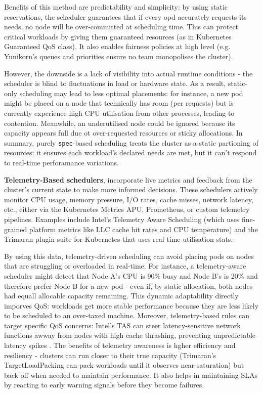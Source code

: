 Benefits of this method are predictability and
simplicity: by using static reservations, the scheduler guarantees that if every
opd accurately requests its needs, no node will be over-committed at scheduling
time. This can protect critical workloads by giving them guaranteed resources
(as in Kubernetes Guaranteed QoS class). It also enables fairness policies at
high level (e.g. Yunikorn's queues and priorities ensure no team monopolises the
cluster).

However, the downside is a lack of visibility into actual runtime conditions -
the scheduler is blind to fluctuations in load or hardware state. As a result,
static-only scheduling may lead to less optimal placements: for instance, a new
pod might be placed on a node that technically has room (per requests) but is
currently experience high CPU utilisation from other processes, leading to
contention. Meanwhile, an underutilised node could be ignored because its
capacity appears full due ot over-requested resources or sticky allocations. In
summary, purely \verb|spec|-based scheduling treats the cluster as a static
partioning of resources; it ensures each workload's declared needs are met, but
it can't respond to real-time perforamance variations.

\textbf{Telemetry-Based schedulers}, incorporate live metrics and feedback from
the cluster's current state to make more informed decisions. These schedulers
actively monitor CPU usage, memory pressure, I/O rates, cache misses, network
latency, etc., either via the Kubernetes Metrics APU, Prometheus, or custom
telemetry pipelines. Examples include Intel's Telemetry Aware Scheduling \cite{}
(which uses fine-grained platform metrics like LLC cache hit rates and CPU
temperature) and the Trimaran plugin suite for Kubernetes \cite{} that uses
real-time utilisation stats.

By using this data, telemetry-driven scheduling can avoid placing pods on nodes
that are struggling or overloaded in real-time. For instance, a telemetry-aware
scheduler might detect that Node A's CPU is 90\% busy and Node B's is 20\% and
therefore prefer Node B for a new pod - even if, by static allocation, both
nodes had equall allocable capacity remaining. This dynamic adaptability
directly imporves QoS: workloads get more stable performance because they are
less likely to be scheduled to an over-taxed machine. Moreover, telemetry-based
rules can target specific QoS concerns: Intel's TAS can steer latency-sensitive
network functions awway from nodes with high cache thrashing, preventing
unpredictable latency spikes \cite{}. The benefits of telemetry awareness is
hgher efficiency and resiliency - clusters can run closer to their true capacity
(Trimaran's TargetLoadPacking can pack workloads until it observes
near-saturation) but back off when needed to maintain performance. It also helps
in maintaining SLAs by reacting to early warning signals before they become
failures.

